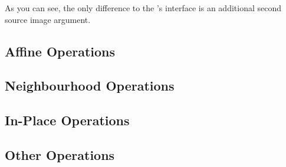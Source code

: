 
As you can see, the only difference to the 's interface is an additional second source image argument.

\subsection{Affine Operations\label{subsec:affine-ops}}

\subsection{Neighbourhood Operations\label{subsec:nbh-ops}}

\subsection{In-Place Operations\label{subsec:inplace-ops}}

\subsection{Other Operations\label{subsec:other-ops}} 
